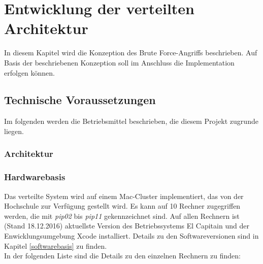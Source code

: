 \chapter{Entwicklung der verteilten Architektur}
\label{vorueberlegungen}
In diesem Kapitel wird die Konzeption des Brute Force-Angriffs beschrieben. Auf Basis der beschriebenen Konzeption soll im Anschluss die Implementation erfolgen können. 


\section{Technische Voraussetzungen}
\label{Voraussetzungen}
Im folgenden werden die Betriebsmittel beschrieben, die diesem Projekt zugrunde liegen.

\subsection{Architektur}

\subsection{Hardwarebasis}
Das verteilte System wird auf einem Mac-Cluster implementiert, das von der Hochschule zur Verfügung gestellt wird. Es kann auf 10 Rechner zugegriffen werden, die mit \emph{pip02} bis \emph{pip11} gekennzeichnet sind. Auf allen Rechnern ist (Stand 18.12.2016) aktuellste Version des Betriebssystems El Capitain und der Enwicklungsumgebung Xcode installiert. Details zu den Softwareversionen sind in Kapitel \ref{softwarebasis} zu finden. \\
In der folgenden Liste sind die Details zu den einzelnen Rechnern zu finden:

